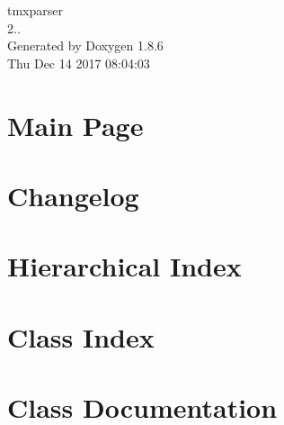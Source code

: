 \documentclass[twoside]{book}
\newcommand{\clearemptydoublepage}{%
  \newpage{\pagestyle{empty}\cleardoublepage}%
}
\begin{document}
\hypersetup{pageanchor=false}
\begin{titlepage}
\vspace*{7cm}
\begin{center}%
{\Large tmxparser \\[1ex]\large 2.. }\\
\vspace*{1cm}
{\large Generated by Doxygen 1.8.6}\\
\vspace*{0.5cm}
{\small Thu Dec 14 2017 08:04:03}\\
\end{center}
\end{titlepage}
\clearemptydoublepage
\tableofcontents
\clearemptydoublepage
{}
\hypersetup{pageanchor=true}

\chapter{Main Page}
\label{index}\hypertarget{index}{}
\chapter{Changelog}
\label{md__home_travis_build_sainteos_tmxparser_CHANGELOG}
\hypertarget{md__home_travis_build_sainteos_tmxparser_CHANGELOG}{}

\chapter{Hierarchical Index}

\chapter{Class Index}

\chapter{Class Documentation}






















\newpage
{}
{}
\printindex
\end{document}
